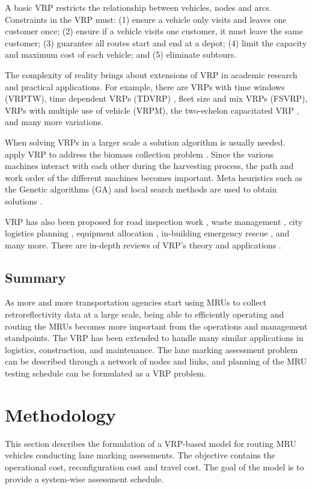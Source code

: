 \documentclass[numbered]{trbunofficial}
\begin{document}
A basic VRP restricts the relationship between vehicles, nodes and arcs. Constraints in the VRP must: (1) ensure a vehicle only visits and leaves one customer once; (2) ensure if a vehicle visits one customer, it must leave the same customer; (3) guarantee all routes start and end at a depot; (4)  limit  the capacity and maximum cost of each vehicle; and (5) eliminate subtours.

The complexity of reality brings about extensions of VRP in academic research and practical applications. For example, there are VRPs with time windows (VRPTW), time dependent VRPs (TDVRP) \cite{10.2307/25768538}, fleet size and mix VRPs (FSVRP), VRPs with multiple use of vehicle (VRPM), the two-echelon capacitated VRP \cite{Perboli2011}, and many more variations. 

When solving VRPs in a larger scale a solution algorithm is usually needed. \citep{Gracia2014} apply VRP to address the biomass collection problem \cite{Gracia2014}. Since the various machines interact with each other during the harvesting process, the path and work order of the different machines becomes important. Meta heuristics such as the Genetic algorithms (GA) and local search methods are used to obtain solutions \cite{YueqinZhang2008}.

VRP has also been proposed for road inspection work \cite{wang2013}, waste management \cite{Sahoo:2005:ROW:1052709.1052730}, city logistics planning \cite{Crainic:2009:MEP:1656425.1656429}, equipment allocation \cite{Chen2011}, in-building emergency rescue \cite{Chen2016}, and many more. There are in-depth reviews of VRP's theory and applications \cite{Laporte:2009:FYV:1656425.1656427,PILLAC20131}.

\subsection{Summary}
As more and more transportation agencies start using MRUs to collect retroreflectivity data at a large scale, being able to efficiently operating and routing the MRUs becomes more important from the operations and management standpoints.  The VRP has been extended to handle many similar applications in logistics, construction, and maintenance. The lane marking assessment problem can be described through a network of nodes and links, and planning of the MRU testing schedule can be formulated as a VRP problem.

\section{Methodology}
This section describes the formulation of a VRP-based model for routing MRU vehicles conducting lane marking assessments. The objective contains the operational cost, reconfiguration cost and travel cost. The goal of the model is to provide a system-wise assessment schedule.
\end{document}
